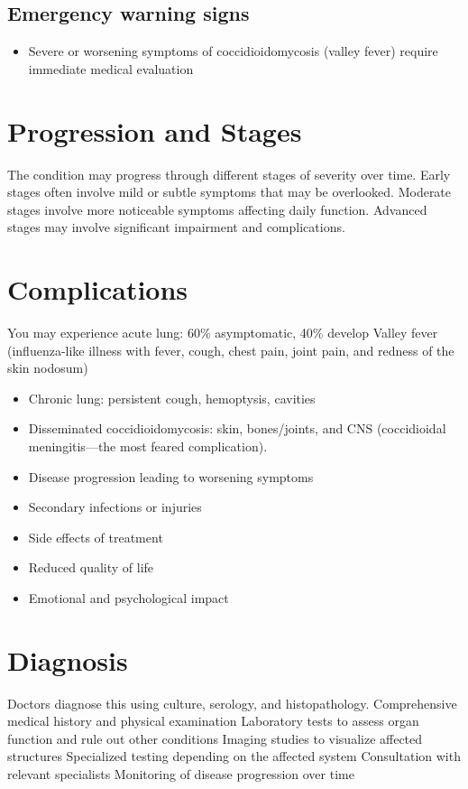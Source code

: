 \subsection{Emergency warning signs}
\begin{itemize}[noitemsep]
  \item Severe or worsening symptoms of coccidioidomycosis (valley fever) require immediate medical evaluation
\end{itemize}
\section{Progression and Stages}
The condition may progress through different stages of severity over time. Early stages often involve mild or subtle symptoms that may be overlooked. Moderate stages involve more noticeable symptoms affecting daily function. Advanced stages may involve significant impairment and complications.
\section{Complications}
You may experience acute lung: 60\% asymptomatic, 40\% develop Valley fever (influenza-like illness with fever, cough, chest pain, joint pain, and redness of the skin nodosum)

\begin{itemize}[noitemsep]
  \item Chronic lung: persistent cough, hemoptysis, cavities
  \item Disseminated coccidioidomycosis: skin, bones/joints, and CNS (coccidioidal meningitis---the most feared complication).
  \item Disease progression leading to worsening symptoms
  \item Secondary infections or injuries
  \item Side effects of treatment
  \item Reduced quality of life
  \item Emotional and psychological impact
\end{itemize}
\section{Diagnosis}
Doctors diagnose this using culture, serology, and histopathology. Comprehensive medical history and physical examination Laboratory tests to assess organ function and rule out other conditions Imaging studies to visualize affected structures Specialized testing depending on the affected system Consultation with relevant specialists Monitoring of disease progression over time

